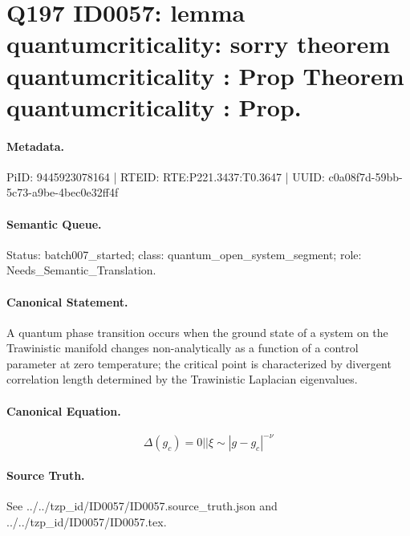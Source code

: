 \section*{Q197 ID0057: lemma quantumcriticality: sorry theorem quantumcriticality : Prop Theorem quantumcriticality : Prop.}
\paragraph{Metadata.}
PiID: 9445923078164 | RTEID: RTE:P221.3437:T0.3647 | UUID: c0a08f7d-59bb-5c73-a9be-4bec0e32ff4f

\paragraph{Semantic Queue.}
Status: batch007\_started; class: quantum\_open\_system\_segment; role: Needs\_Semantic\_Translation.

\paragraph{Canonical Statement.}
A quantum phase transition occurs when the ground state of a system on the Trawinistic manifold changes non-analytically as a function of a control parameter at zero temperature; the critical point is characterized by divergent correlation length determined by the Trawinistic Laplacian eigenvalues.

\paragraph{Canonical Equation.}
\[
\Delta(g_{c}) = 0 || \xi \sim |g-g_{c}|^{-\nu}
\]

\paragraph{Source Truth.}
See ../../tzp\_id/ID0057/ID0057.source\_truth.json and ../../tzp\_id/ID0057/ID0057.tex.
